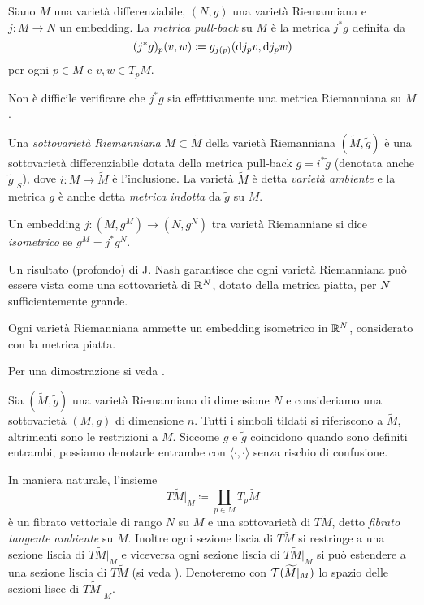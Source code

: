 	\begin{defi}
		Siano \(M\) una varietà differenziabile, \((N,g)\) una varietà Riemanniana e \(j:M \to N\) un embedding. La \textit{metrica pull-back} su \(M\) è la metrica \(j^*g\) definita da
		\[
		(j^*g)_p(v,w) \coloneq g_{j(p)}(\mathrm{d} j_pv,\mathrm{d} j_p w)
		\]
		per ogni \(p \in M\) e \(v,w \in T_pM\). 
	\end{defi}
	Non è difficile verificare che \(j^*g\) sia effettivamente una metrica Riemanniana su \(M\).
	
	\begin{defi}
		Una \textit{sottovarietà Riemanniana} \(M \subset \widetilde{M}\) della varietà Riemanniana \((\widetilde{M},\widetilde{g})\) è una sottovarietà differenziabile dotata della metrica pull-back \(g=i^*\widetilde{g}\) (denotata anche \(\widetilde{g}|_S\)), dove \(i:M \to \widetilde{M}\) è l'inclusione. La varietà \(\widetilde{M}\) è detta \textit{varietà ambiente} e la metrica \(g\) è anche detta \textit{metrica indotta} da \(\widetilde{g}\) su \(M\). 
	\end{defi}
	
	\begin{defi}
		Un embedding \(j:(M,g^M) \to (N,g^N)\) tra varietà Riemanniane si dice \textit{isometrico} se \(g^M = j^*g^N\).
	\end{defi}
	
	Un risultato (profondo) di J. Nash \cite{nash1956imbedding} garantisce che ogni varietà Riemanniana può essere vista come una sottovarietà di \(\mathbb{R}^N\), dotato della metrica piatta, per \(N\) sufficientemente grande.
	
	\begin{teo}[Nash]\label{teo: embedding isometrico di Nash}
		Ogni varietà Riemanniana ammette un embedding isometrico in \(\mathbb{R}^N\), considerato con la metrica piatta. 
	\end{teo}
	Per una dimostrazione si veda \cite[Theorem 3.1.1]{delellis2017masterpieces}.
	
	Sia \((\widetilde{M},\widetilde{g})\) una varietà Riemanniana di dimensione \(N\) e consideriamo una sottovarietà \((M,g)\) di dimensione \(n\). Tutti i simboli tildati si riferiscono a \(\widetilde{M}\), altrimenti sono le restrizioni a \(M\). Siccome \(g\) e \(\widetilde{g}\) coincidono quando sono definiti entrambi, possiamo denotarle entrambe con \(\langle\cdot ,\cdot\rangle\) senza rischio di confusione. 
	
	In maniera naturale, l'insieme
	\[
	T\widetilde{M}|_M \coloneq \coprod_{p \in M} T_p\widetilde{M}
	\]
	è un fibrato vettoriale di rango \(N\) su \(M\) e una sottovarietà di \(T \widetilde{M}\), detto \textit{fibrato tangente ambiente} su \(M\). Inoltre ogni sezione liscia di \(T\widetilde{M}\) si restringe a una sezione liscia di \(T\widetilde{M}|_M\) e viceversa ogni sezione liscia di \(T\widetilde{M}|_M\) si può estendere a una sezione liscia di \(T\widetilde{M}\) (si veda \cite[p. 132]{lee1997riemannian}). Denoteremo con \(\mathcal{T}(\widetilde{M}|_M)\) lo spazio delle sezioni lisce di \(T\widetilde{M}|_M\).
	
